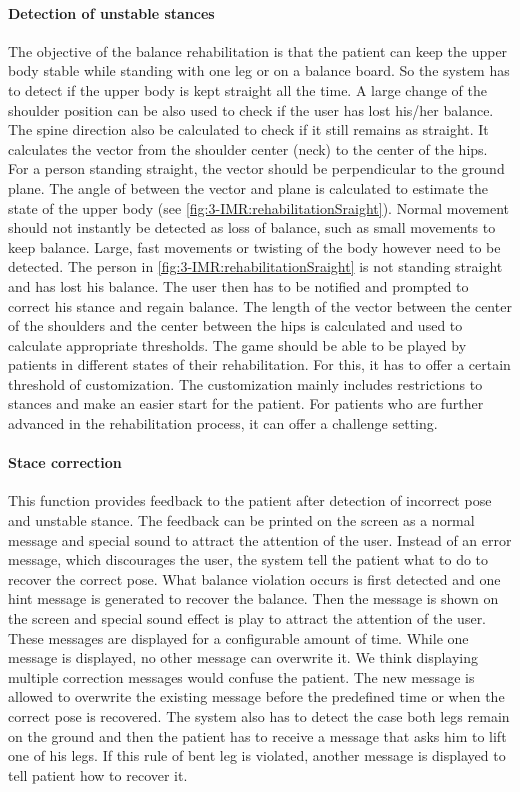 \paragraph{Detection of unstable stances}
The objective of the balance rehabilitation is that the patient can keep the upper body stable while standing with one leg or on a balance board. So the system has to detect if the upper body is kept straight all the time.  A large change of the shoulder position can be also used to check if the user has lost his/her balance. The spine direction also be calculated to check if it still remains as straight.
It calculates the vector from the shoulder center (neck) to the center of the hips. For a person standing straight, the vector should be perpendicular to the ground plane. The angle of between the vector and plane is calculated to estimate the state of the upper body (see \figurename{\ref{fig:3-IMR:rehabilitationSraight}}). 
Normal movement should not instantly be detected as loss of balance, such as small movements to keep balance. Large, fast movements or twisting of the body however need to be detected. The person in \figurename{\ref{fig:3-IMR:rehabilitationSraight}} is not standing straight and has lost his balance. The user then has to be notified and prompted to correct his stance and regain balance.
The length of the vector between the center of the shoulders and the center between the hips is calculated and used to calculate appropriate thresholds. 
The game should be able to be played by patients in different states of their rehabilitation. For this, it has to offer a certain threshold of customization. The customization mainly includes restrictions to stances and make an easier start for the patient. For patients who are further advanced in the rehabilitation process, it can offer a challenge setting.

\paragraph{Stace correction}
This function provides feedback to the patient after detection of incorrect pose and unstable stance. The feedback can be printed on the screen as a normal message and special sound to attract the attention of the user.
Instead of an error message, which discourages the user, the system tell the patient what to do to recover the correct pose.
What balance violation occurs is first detected and one hint message is generated to recover the balance. Then the message is shown on the screen and special sound effect is play to attract the attention of the user. These messages are displayed for a configurable amount of time. While one message is displayed, no other message can overwrite it. We think displaying multiple correction messages would confuse the patient. 
The new message is allowed to overwrite the existing message before the predefined time or when the correct pose is recovered.
The system also has to detect the case both legs remain on the ground and then the patient has to receive a message that asks him to lift one of his legs. 
If this rule of bent leg is violated, another message is displayed to tell patient how to recover it.

